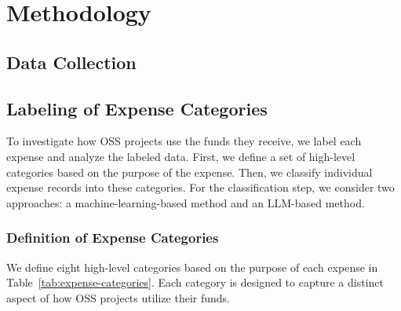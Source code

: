 \documentclass[11pt]{ist-thesis-lt}
\begin{document}
\section{Methodology}

\subsection{Data Collection}

\subsection{Labeling of Expense Categories}

To investigate how OSS projects use the funds they receive, we label each expense and analyze the labeled data. First, we define a set of high-level categories based on the purpose of the expense. Then, we classify individual expense records into these categories. For the classification step, we consider two approaches: a machine-learning-based method and an LLM-based method.

\subsubsection{Definition of Expense Categories}

We define eight high-level categories based on the purpose of each expense in Table~\ref{tab:expense-categories}.
Each category is designed to capture a distinct aspect of how OSS projects utilize their funds.
\end{document}
